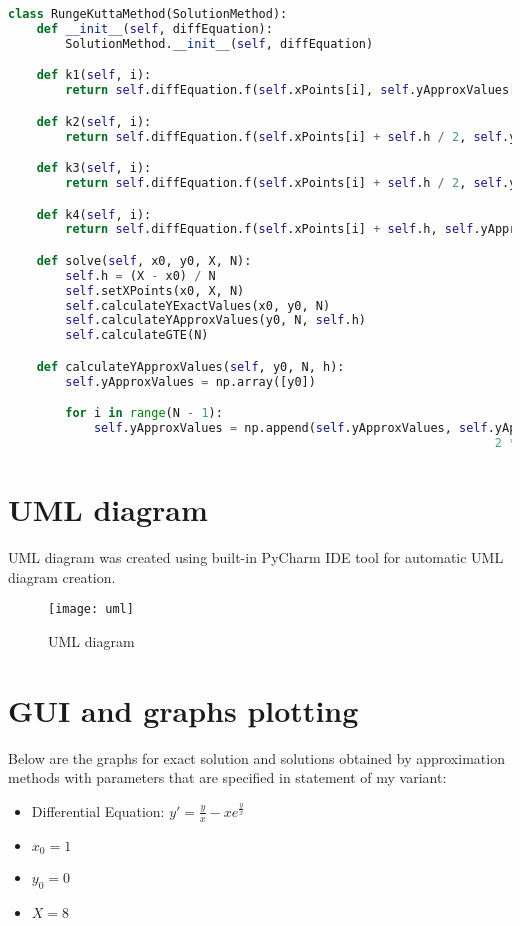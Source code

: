 \documentclass[12pt, a4paper]{article}
\begin{document}
    \begin{lstlisting}[language=Python, caption=RungeKuttaMethod class]
class RungeKuttaMethod(SolutionMethod):
    def __init__(self, diffEquation):
        SolutionMethod.__init__(self, diffEquation)

    def k1(self, i):
        return self.diffEquation.f(self.xPoints[i], self.yApproxValues[i])

    def k2(self, i):
        return self.diffEquation.f(self.xPoints[i] + self.h / 2, self.yApproxValues[i] + self.h / 2 * self.k1(i))

    def k3(self, i):
        return self.diffEquation.f(self.xPoints[i] + self.h / 2, self.yApproxValues[i] + self.h / 2 * self.k2(i))

    def k4(self, i):
        return self.diffEquation.f(self.xPoints[i] + self.h, self.yApproxValues[i] + self.h * self.k3(i))

    def solve(self, x0, y0, X, N):
        self.h = (X - x0) / N
        self.setXPoints(x0, X, N)
        self.calculateYExactValues(x0, y0, N)
        self.calculateYApproxValues(y0, N, self.h)
        self.calculateGTE(N)

    def calculateYApproxValues(self, y0, N, h):
        self.yApproxValues = np.array([y0])

        for i in range(N - 1):
            self.yApproxValues = np.append(self.yApproxValues, self.yApproxValues[i] + h / 6 * (self.k1(i) +
                                                                    2 * self.k2(i) + 2 * self.k3(i) + self.k4(i)))
    \end{lstlisting}
    
\section{UML diagram}
UML diagram was created using built-in PyCharm IDE tool for automatic UML diagram creation.
    \begin{figure}[H]
        \centering
        \texttt{[image: uml]}
        \caption{UML diagram}
        \label{fig:my_label}
    \end{figure}

\newpage
\section{GUI and graphs plotting}
Below are the graphs for exact solution and solutions obtained by approximation methods with parameters that are specified in statement of my variant:
\begin{itemize}
    \item Differential Equation: $y' = \frac{y}{x} - xe^{\frac{y}{x}}$
    \item $x_0 = 1$
    \item $y_0 = 0$
    \item $X = 8$
\end{itemize}
\end{document}
